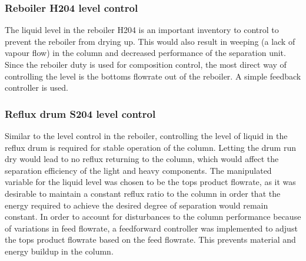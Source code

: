 


\subsubsection{Reboiler H204 level control} %
The liquid level in the reboiler H204 is an important inventory to control to prevent the reboiler from drying up. This would also result in weeping (a lack of vapour flow) in the column and decreased performance of the separation unit. Since the reboiler duty is used for composition control, the most direct way of controlling the level is the bottoms flowrate out of the reboiler. A simple feedback controller is used. 

\subsubsection{Reflux drum S204 level control}%
Similar to the level control in the reboiler, controlling the level of liquid in the reflux drum is required for stable operation of the column. Letting the drum run dry would lead to no reflux returning to the column, which would affect the separation efficiency of the light and heavy components. The manipulated variable for the liquid level was chosen to be the tops product flowrate, as it was desirable to maintain a constant reflux ratio to the column in order that the energy required to achieve the desired degree of separation would remain constant. In order to account for disturbances to the column performance because of variations in feed flowrate, a feedforward controller was implemented to adjust the tops product flowrate based on the feed flowrate. This prevents material and energy buildup in the column. 


